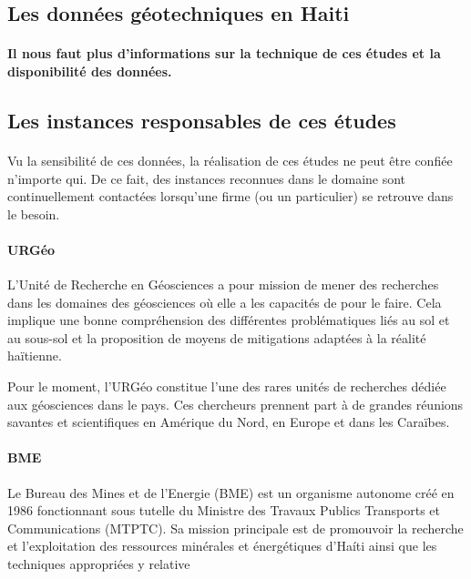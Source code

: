         \subsection{Les données géotechniques en Haiti}
        \paragraph{Il nous faut plus d'informations sur la technique de ces études et la disponibilité
        des données.}
        \lipsum[1]
        \subsection{Les instances responsables de ces études}
        \paragraph{}
        Vu la sensibilité de ces données, la réalisation de ces études ne peut être confiée n'importe qui. De ce 
        fait, des instances reconnues dans le domaine sont continuellement contactées 
        lorsqu'une firme (ou un particulier) se retrouve dans le besoin.
        \paragraph{URGéo}
        L'Unité de Recherche en Géosciences a pour mission de mener des recherches dans les
        domaines des géosciences où elle a les capacités de pour le faire.
        Cela implique une bonne compréhension des différentes problématiques liés au sol et
        au sous-sol et la proposition de moyens de mitigations adaptées à la réalité haïtienne.
        \cite{mission_urgeo}
        \par
        Pour le moment, l’URGéo constitue l’une des rares unités de recherches dédiée aux
        géosciences dans le pays. 
        Ces chercheurs prennent part à de grandes réunions savantes et scientifiques en
        Amérique du Nord, en Europe et dans les Caraïbes.
        \cite{urgeo_nouvelliste}
        \paragraph{BME}
        Le Bureau des Mines et de l’Energie (BME) est un organisme autonome créé en 
        1986 fonctionnant sous  tutelle du Ministre des Travaux Publics Transports 
        et Communications (MTPTC). Sa mission principale est de promouvoir la recherche
        et l'exploitation des ressources minérales et énergétiques d'Haíti ainsi que les 
        techniques appropriées y relative
